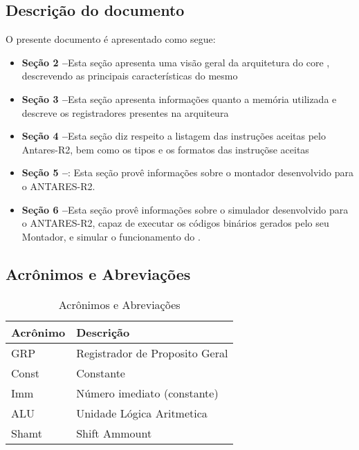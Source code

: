 \documentclass{report}
\begin{document}
\subsection{Descrição do documento}

O presente documento é apresentado como segue:

  \begin{itemize}
   \item \textbf{Seção 2 --}Esta seção apresenta uma visão geral da arquitetura do core \ipPROCESSProject, descrevendo as principais características do mesmo
   \item \textbf{Seção 3 --}Esta seção apresenta informações quanto a memória utilizada e descreve os registradores presentes na arquiteura
   \item \textbf{Seção 4 --}Esta seção diz respeito a listagem das instruções aceitas pelo Antares-R2, bem como os tipos e os formatos das instruçõse aceitas
   \item \textbf{Seção 5 --}: Esta seção provê informações sobre o montador desenvolvido
para o ANTARES-R2.
   \item \textbf{Seção 6 --}Esta seção provê informações sobre o simulador desenvolvido
para o ANTARES-R2, capaz de executar os códigos binários gerados pelo seu Montador, e simular o funcionamento do .
  \end{itemize}

  \subsection{Acrônimos e Abreviações}
    \FloatBarrier
    \begin{table}[H]
      \begin{center}
        \begin{tabular}[pos]{|m{2cm} | m{8cm}|} 
          \hline
          \cellcolor[gray]{0.9}\textbf{Acrônimo} & \cellcolor[gray]{0.9}\textbf{Descrição} \\ \hline
               GRP & Registrador de Proposito Geral  \\ \hline
               Const & Constante  \\ \hline
               Imm & Número imediato (constante)  \\ \hline
               ALU & Unidade Lógica Aritmetica \\ \hline
               Shamt & Shift Ammount \\ \hline
        \end{tabular}
        \caption{Acrônimos e Abreviações}
		\label{table:acronimos}
      \end{center}
    \end{table}  
\end{document}
